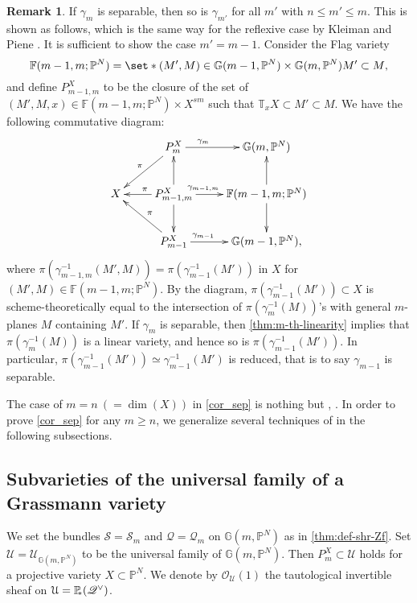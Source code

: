 \documentclass[a4paper,12pt]{amsart}
\theoremstyle{plain}
\theoremstyle{definition}
\newtheorem{rem}[rem]{Remark}
\begin{document}
\begin{rem}\label{thm:m-1-th-sep}
  If $\gamma_m$ is separable, then
  so is $\gamma_{m'}$ for all $m'$ with $n {\leqslant} m' {\leqslant} m$.
  This is shown as follows, which is the same way
  for the reflexive case by Kleiman and Piene \cite[pp.~108--109]{KP}.
  It is sufficient to show the case $m' = m-1$.
  Consider the Flag variety
  \[
  {\mathbb {F}}(m-1,m;{{\mathbb{P}}^N}) = \set*{(M',M) \in {\mathbb{G}}(m-1, {{\mathbb{P}}^N}) \times {\mathbb{G}}(m, {{\mathbb{P}}^N})}{M' \subset M},
  \]
  and define $P_{m-1,m}^X$ to be the closure of the set of
  $(M',M, x) \in {\mathbb {F}}(m-1,m;{{\mathbb{P}}^N}) \times X^{sm}$
  such that ${\mathbb{T}}_xX \subset M' \subset M$.
  We have the following commutative diagram:
  \[
  \xymatrix{    & P_m^X \ar[r]^{\kern-3em\gamma_m} \ar[ld]_{\pi}& {\mathbb{G}}(m, {{\mathbb{P}}^N})
    \\
    X &P_{m-1,m}^X \ar[r]^{\kern-3em\gamma_{m-1,m}} \ar[u] \ar[d] \ar[l]_{\pi}& {\mathbb {F}}(m-1,m;{{\mathbb{P}}^N}) \ar[u] \ar[d]
    \\
    & P_{m-1}^X \ar[r]^{\kern-3em\gamma_{m-1}} \ar[lu]_{\pi}& {\mathbb{G}}(m-1, {{\mathbb{P}}^N}),
  }  \]
  where $\pi(\gamma_{m-1,m}^{-1}(M',M)) = \pi(\gamma_{m-1}^{-1}(M'))$
  in $X$ for $(M',M) \in {\mathbb {F}}(m-1,m;{{\mathbb{P}}^N})$.
  By the diagram,
  $\pi(\gamma_{m-1}^{-1}(M')) \subset X$ is scheme-theoretically equal to
  the intersection of $\pi(\gamma_{m}^{-1}(M))$'s with
  general $m$-planes $M$ containing $M'$.
  If $\gamma_m$ is separable, then \autoref{thm:m-th-linearity} implies that $\pi(\gamma_{m}^{-1}(M))$ is a linear variety, and hence so is $\pi(\gamma_{m-1}^{-1}(M'))$.
  In particular, $\pi(\gamma_{m-1}^{-1}(M')) \simeq \gamma_{m-1}^{-1}(M')$ is reduced, that is to say $\gamma_{m-1}$ is separable.
\end{rem}

The case of $m=n \ (= \dim(X))$ in \autoref{cor_sep} is nothing but
\cite[Theorem~3.1]{expshr}, \cite[Corollary~5.4]{FI}.
In order to prove \autoref{cor_sep} for any $m {\geqslant} n$,
we generalize several techniques of \cite{FI}
in the following subsections.

\subsection{Subvarieties of the universal family of a Grassmann variety}

We set the bundles ${\mathscr{S}} = {\mathscr{S}}_{m}$ and ${\mathscr{Q}} = {\mathscr{Q}}_{m}$ on ${{\mathbb{G}}(m,{{\mathbb{P}}^N})}$
as in \autoref{thm:def-shr-Zf}.
Set ${\mathcal {U}} = {\mathcal {U}}_{{\mathbb{G}}(m,{{\mathbb{P}}^N})}$ to be
the universal family of ${{\mathbb{G}}(m,{{\mathbb{P}}^N})}$.
Then $P_m^X \subset {\mathcal {U}}$ holds for a projective variety $X \subset {{\mathbb{P}}^N}$.
We denote by ${\mathscr{O}}_{\mathcal{U}}(1)$ the tautological invertible sheaf on ${\mathcal{U}} = {{{\mathbb{P}}_{\!\! *}}}({\mathscr{Q}}\spcheck)$.
\end{document}
